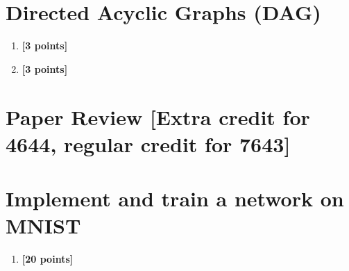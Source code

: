\documentclass[11pt,english]{article}
\begin{document}
\section{Directed Acyclic Graphs (DAG)}


\begin{enumerate}[resume]

\item
\textbf{[3 points]}


\item
\textbf{[3 points]}


\end{enumerate}

\section{Paper Review [Extra credit for 4644, regular credit for 7643]}



\section{Implement and train a network on MNIST}

\begin{enumerate}[resume]

\item
\textbf{[20 points]}


\end{enumerate}
\end{document}
